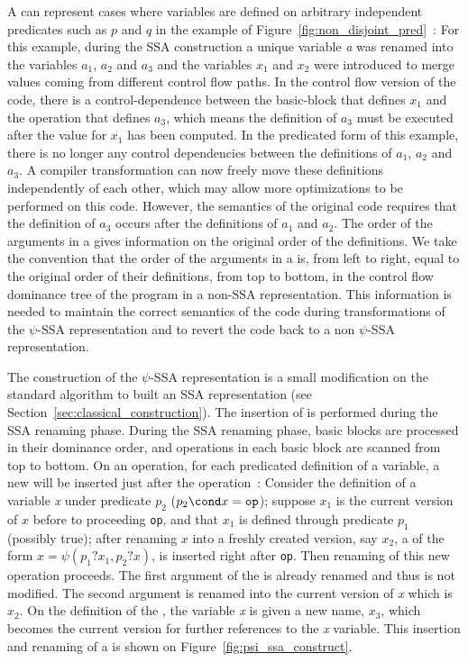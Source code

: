 A \psifun can represent cases where variables are defined on arbitrary independent
predicates such as $p$ and $q$ in the example of Figure~\ref{fig:non_disjoint_pred}~: For this example, during the SSA
construction a unique variable \textit{a} was renamed into the variables
${a_1}$, ${a_2}$ and ${a_3}$ and the variables ${x_1}$
and ${x_2}$ were introduced to merge values coming from different
control flow paths. In the control flow version of the code, there is a
control-dependence between the basic-block that defines ${x_1}$ and the operation that defines ${a_3}$, which means
the definition of ${a_3}$ must be executed after the value for
${x_1}$ has been computed. In the predicated form of this example,
there is no longer any control dependencies between the definitions of
${a_1}$, ${a_2}$ and ${a_3}$. A compiler transformation
can now freely move these definitions independently of each other,
which may allow more optimizations to be performed on this
code. However, the semantics of the original code requires that the
definition of ${a_3}$ occurs after the definitions of ${a_1}$
and ${a_2}$. The order of the arguments in a \psifun gives
information on the original order of the definitions. We take the
convention that the order of the arguments in a \psifun is,
from left to right, equal to the original order of their definitions,
from top to bottom, in the control flow dominance tree of the program
in a non-SSA representation. This information is needed to maintain
the correct semantics of the code during transformations of the
$\psi$-SSA representation and to revert the code back to a non
$\psi$-SSA representation.


The construction of the $\psi$-SSA representation is a small
modification on the standard algorithm to built an SSA representation (see Section~\ref{sec:classical_construction}).
%
The insertion of \psifuns is performed during the SSA renaming
phase.
%
During the SSA renaming phase, basic blocks are processed in their
dominance order, and operations in each basic block are scanned from
top to bottom. On an operation, for each predicated definition of a
variable, a new \psifun will be inserted just after the
operation~: Consider the definition of a variable \textit{x} under predicate
${p_2}$ ($p_2\cond x= \texttt{op}$); suppose ${x_1}$ is the current version of $x$ before
to proceeding \texttt{op}, and that $x_1$ is defined through predicate $p_1$ (possibly true); after renaming $x$ into a freshly created version, say $x_2$, a \psifun of the form ${x = \psi(p_1?x_1,
  p_2?x)}$, is inserted right after \texttt{op}. 
Then renaming of this new operation proceeds. The first argument of
the \psifun is already renamed and thus is not modified. The
second argument is renamed into the current version of \textit{x}
which is ${x_2}$. On the definition of the \psifun, the
variable \textit{x} is given a new name, ${x_3}$, which becomes the
current version for further references to the \textit{x} variable. This
insertion and renaming of a \psifun is shown on
Figure~\ref{fig:psi_ssa_construct}.

